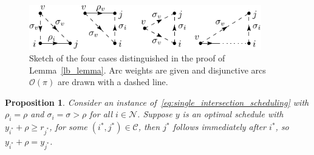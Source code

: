 \documentclass[a4paper]{article}
\theoremstyle{definition}
\theoremstyle{plain}
\newtheorem{proposition}{Proposition}
\begin{document}
\begin{figure}
  \centering
  \includegraphics[width=0.9\textwidth]{figures/lower-bound-lemma.pdf}
  \caption{Sketch of the four cases distinguished in the proof of
    Lemma~\ref{lb_lemma}. Arc weights are given and disjunctive arcs
    $\mathcal{O}(\pi)$ are drawn with a dashed line.}\label{fig:lb_lemma}
\end{figure}


\begin{proposition}\label{prop:exhaustive}
  Consider an instance of~\eqref{eq:single_intersection_scheduling} with $\rho_{i} = \rho$ and $\sigma_{i} = \sigma > \rho$ for all
  $i \in \mathcal{N}$. Suppose $y$ is an optimal schedule with
  $y_{i^{*}} + \rho \geq r_{j^{*}}$, for some $(i^{*},j^{*}) \in \mathcal{C}$, then
  $j^{*}$ follows immediately after $i^{*}$, so $y_{i^{*}} + \rho = y_{j^{*}}$.
\end{proposition}
\end{document}

